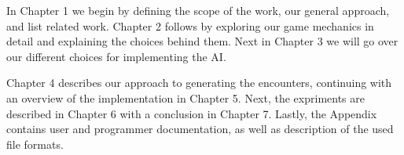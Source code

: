 In Chapter 1 we begin by defining the scope of the work, our general approach,
and list related work. Chapter 2 follows by exploring our game mechanics in
detail and explaining the choices behind them. Next in Chapter 3 we will go
over our different choices for implementing the AI.

Chapter 4 describes our approach to generating the encounters, continuing with an overview of the implementation in Chapter 5.  Next, the expriments are described in Chapter 6 with a conclusion in Chapter 7. Lastly, the Appendix contains user and programmer documentation, as well as description of the used file formats.
